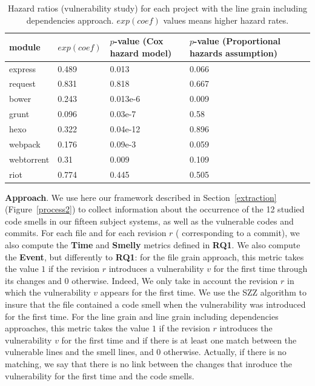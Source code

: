 {\begin{table}[t]
\end{table}

\begin{table}[t]
	\centering
	\scriptsize
	\caption{Hazard ratios (vulnerability study) for each project with the line grain including dependencies approach. $exp(coef)$ values means higher hazard rates.}
	\label{vulnlinegraindep}
	\begin{tabular}{l|l|l|l}
		\hline
		module & $exp(coef)$ & $p$-value (Cox hazard model) & $p$-value (Proportional hazards assumption)     \\ \hline
		express  & 0.489 & 0.013 & 0.066 \\ \hline
		request  & 0.831 & 0.818 & 0.667 \\ \hline
		bower	 & 0.243 & 0.013e-6 & 0.009 \\ \hline
		grunt    & 0.096 & 0.03e-7 & 0.58 \\ \hline
		hexo	 & 0.322 & 0.04e-12 & 0.896 \\ \hline
		webpack	 & 0.176 & 0.09e-3 & 0.059 \\ \hline
		webtorrent & 0.31 & 0.009 & 0.109 \\ \hline
		riot	 & 0.774 & 0.445 & 0.505 \\ \hline
	\end{tabular}

\end{table}

\textbf{Approach}. We use here our framework described in Section~\ref{extraction} {\color{blue}(Figure~\ref{process2})} to collect information about the occurrence of the 12 studied code smells in our {\color{blue}fifteen} subject systems, as well as the vulnerable codes and commits.
For each file and for each revision $r$ (\ie{} corresponding to a commit), we also compute the \textbf{Time} and \textbf{Smelly} metrics defined in \textbf{RQ1}. We also compute the \textbf{Event}, but differently to \textbf{RQ1}: for the file grain approach, this metric takes the value $1$ if the revision $r$ introduces a vulnerability $v$ for the first time through its changes and $0$ otherwise. Indeed, We only take in account the revision $r$ in which the vulnerability $v$ appears for the first time. We use the SZZ algorithm to insure that the file contained a code smell when the vulnerability was introduced for the first time. For the line grain and line grain including dependencies approaches, this metric takes the value $1$ if the revision $r$ introduces the vulnerability $v$ for the first time and if there is at least one match between the vulnerable lines and the smell lines, and $0$ otherwise. Actually, if there is no matching, we say that there is no link between the changes that inroduce the vulnerability for the first time and the code smells.

}
